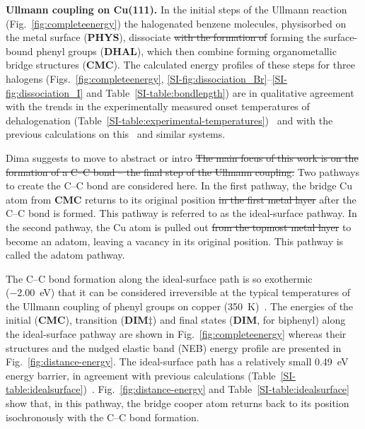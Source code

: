 \documentclass[aps,prb,amsmath,amssymb,11pt]{revtex4-1}
\newcommand{\zhzh}{\color{blue}}
\newcommand{\zhzh}{\color{blue}}
\begin{document}
\textbf{Ullmann coupling on Cu(111).}
%
In the initial steps of the Ullmann reaction (Fig.~\ref{fig:completeenergy}) the halogenated benzene molecules, physisorbed on the metal surface (\textbf{PHYS}), dissociate \sout{with the formation of} {\zhzh forming} the surface-bound phenyl groups (\textbf{DHAL}), which then combine forming organometallic bridge structures (\textbf{CMC}).
The calculated energy profiles of these steps for three halogens (Figs.~\ref{fig:completeenergy}, \ref{SI-fig:dissociation_Br}--\ref{SI-fig:dissociation_I} and Table~\ref{SI-table:bondlength}) are in qualitative agreement with the trends in the experimentally measured onset temperatures of dehalogenation (Table~\ref{SI-table:experimental-temperatures})~\cite{ullmann_52,ullmann_87,ullmann_67} and with the previous calculations on this~\cite{jacs2013,ullmann_88} and similar systems. 

{\zhzh Dima suggests to move to abstract or intro} \sout{The main focus of this work is on the formation of a C--C bond -- the final step of the Ullmann coupling.} 
Two pathways to create the C--C bond are considered here. 
In the first pathway, the bridge Cu atom {\zhzh from \textbf{CMC}} returns to its original position \sout{in the first metal layer} after the C--C bond is formed. This pathway is referred to as the ideal-surface pathway.
In the second pathway, the Cu atom is pulled out \sout{from the topmost metal layer} to become an adatom, leaving a vacancy in its original position. This pathway is called the adatom pathway.

The C--C bond formation along the ideal-surface path is so exothermic (\SI{-2.00}{\electronvolt}) that it can be considered irreversible at the typical temperatures of the Ullmann coupling of phenyl groups on copper (\SI{350}{\kelvin})~\cite{ullmann_67, sur_sci01}. The energies of the initial (\textbf{CMC}), transition (\textbf{DIM$\ddagger$}) and final states (\textbf{DIM}, for biphenyl) along the ideal-surface pathway are shown in Fig.~\ref{fig:completeenergy} whereas their structures and the nudged elastic band (NEB) energy profile are presented in Fig.~\ref{fig:distance-energy}. 
The ideal-surface path has a relatively small \SI{0.49}{\electronvolt} energy barrier, in agreement with previous calculations (Table~\ref{SI-table:idealsurface})~\cite{pccp2010, jacs2013}. %
Fig.~\ref{fig:distance-energy} and Table~\ref{SI-table:idealsurface} show that, in this pathway, the bridge cooper atom returns back to its position isochronously with the C--C bond formation. 
\end{document}
